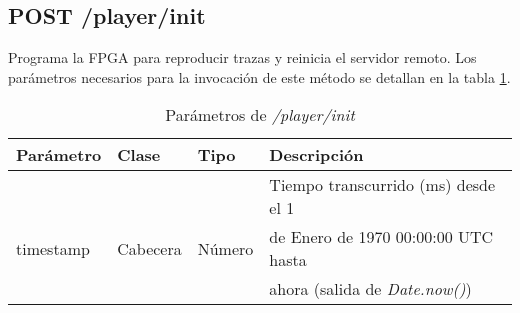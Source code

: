 %
%
\subsection{POST /player/init}

Programa la \gls{FPGA} para reproducir \glspl{traza} y reinicia el servidor remoto. Los parámetros necesarios para la invocación de este método se detallan en la tabla \ref{extra:api:playerinit:invocacion}.

\begin{table}[H]
\centering
\begin{tabular}{|l|l|l|l|}
\hline
\rowcolor[HTML]{F5F5F5}
\textbf{Parámetro}  & \textbf{Clase} & \textbf{Tipo} & \textbf{Descripción}                  \\ \hline
                    &                &               & Tiempo transcurrido (ms) desde el 1   \\
timestamp           & Cabecera       & Número        & de Enero de 1970 00:00:00 UTC hasta   \\
                    &                &               & ahora (salida de \textit{Date.now()}) \\ \hline
\end{tabular}
\caption{Parámetros de \textit{/player/init}}
\label{extra:api:playerinit:invocacion}
\end{table}

